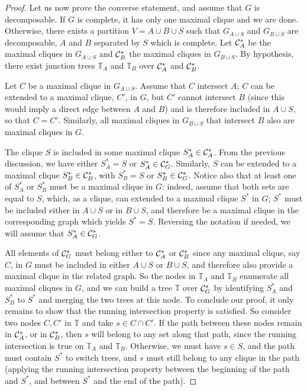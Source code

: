 \begin{proof}
\medskip

Let us now prove the converse statement, and assume that $G$ is
decomposable. If $G$ is complete, it has only one maximal clique and we
are done. Otherwise, there exists a partition $V = A\cup B\cup S$ such
that $G_{A\cup S}$ and $G_{B\cup S}$ are decomposable, $A$ and $B$ separated by $S$
which is complete. Let ${\mathcal C}_A^*$ be the maximal cliques in $G_{A\cup S}$ and
${\mathcal C}_B^*$ the maximal cliques in $G_{B\cup S}$. By hypothesis, there exist
junction trees $\mathbb T_A$ and $\mathbb T_B$ over ${\mathcal C}_A^*$ and
${\mathcal C}_B^*$. 

Let $C$ be a maximal clique in $G_{A\cup S}$. Assume that $C$  intersect
$A$; $C$ can be extended to a maximal clique, $C'$, in $G$,
but $C'$ cannot intersect $B$ (since this would imply a direct edge
between $A$ and $B$) and is therefore included in $A\cup S$,
so that $C=C'$. Similarly, all maximal cliques in $G_{B\cup S}$ that
intersect $B$ also
are maximal cliques in $G$. 

The clique $S$ is included in some maximal clique $S_A^*\in
{\mathcal C}_A^*$. From the previous discussion, we have either $S^*_A = S$ or
$S^*_A \in {\mathcal C}_G^*$. Similarly, $S$ can be extended to a maximal
clique $S^*_B \in {\mathcal C}_B^*$, with $S^*_B=S$ or $S^*_B\in
{\mathcal C}_G^*$. Notice also that at least one of $S^*_A$ or $S^*_B$ must be
a maximal clique in $G$: indeed, assume that both sets are equal to $S$,
which, as a clique, can extended to a maximal clique $S^*$ in $G$;
$S^*$ must be included either in $A\cup S$ or in
$B\cup S$, and therefore be a maximal clique in the corresponding
graph which yields $S^* = S$. Reversing the notation if needed, we
will assume that $S_A^* \in {\mathcal C}_G^*$.

All elements of ${\mathcal C}_G^*$ must belong either to ${\mathcal C}_A^*$ or ${\mathcal C}_B^*$
since any maximal clique, say $C$, in $G$ must be included in either $A\cup
S$ or $B\cup S$, and therefore also provide a maximal
clique in the related graph. So the nodes in $\mathbb T_A$ and
$\mathbb T_B$ enumerate all maximal cliques in $G$, and we can build a
tree $\mathbb T$ over ${\mathcal C}^*_G$ by identifying $S^*_A$ and $S^*_B$ to $S^*$ and
merging the two trees at this node. To conclude our proof, it only
remains to show that the running intersection property is
satisfied. So consider two nodes $C,C'$ in $\mathbb T$ and take $s\in
C\cap C'$. If the path between these nodes remain in ${\mathcal C}^*_A$, or in
${\mathcal C}^*_B$, then $s$ will belong to any set along that path, since the
running intersection is true on $\mathbb T_A$ and $\mathbb
T_B$. Otherwise, we must have $s\in S$, and the path must contain
$S^*$ to switch trees, and $s$ must still belong to any clique in the
path (applying the running intersection property between the beginning
of the path and $S^*$, and between $S^*$ and the end of the path).
\end{proof}

